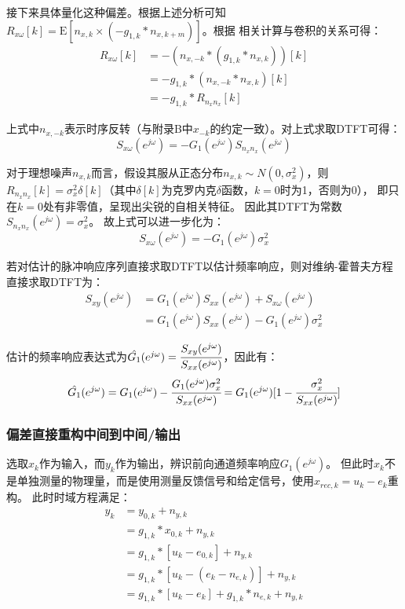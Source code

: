 接下来具体量化这种偏差。根据上述分析可知\(R_{x\omega}[k]=\text{E}[n_{x,k}\times(-g_{1,k}*n_{x,k+m})]\)。根据
相关计算与卷积的关系可得：
\begin{align*}
    R_{x\omega}[k]&=-(n_{x,-k}*(g_{1,k}*n_{x,k}))[k]\\
    &=-g_{1,k} * (n_{x,-k}*n_{x,k})[k]\\
    &=-g_{1,k}*R_{n_xn_x}[k]
\end{align*}

上式中\(n_{x,-k}\)表示时序反转（与附录B中\(x_{-k}\)的约定一致）。对上式求取DTFT可得：
\begin{equation*}
    S_{x\omega}(e^{j\omega})=-G_1(e^{j\omega})S_{n_xn_x}(e^{j\omega})
\end{equation*}

对于理想噪声\(n_{x,k}\)而言，假设其服从正态分布\(n_{x,k}\sim N(0,\sigma_x^2)\)，则
\(R_{n_xn_x}[k]=\sigma_x^2\delta[k]\)（其中\(\delta[k]\)为克罗内克\(\delta\)函数，\(k=0\)时为1，否则为0），
即只在\(k=0\)处有非零值，呈现出尖锐的自相关特征。
因此其DTFT为常数\(S_{n_xn_x}(e^{j\omega})=\sigma_x^2\)。
故上式可以进一步化为：
\begin{equation*}
    S_{x\omega}(e^{j\omega})=-G_1(e^{j\omega})\sigma_x^2
\end{equation*}

若对估计的脉冲响应序列直接求取DTFT以估计频率响应，则对维纳-霍普夫方程直接求取DTFT为：
\begin{align*}
    S_{xy}(e^{j\omega})&=G_1(e^{j\omega})S_{xx}(e^{j\omega})+S_{x\omega}(e^{j\omega})\\
    &=G_1(e^{j\omega})S_{xx}(e^{j\omega})-G_1(e^{j\omega})\sigma_x^2
\end{align*}

估计的频率响应表达式为\(\hat{G_1}(e^{j\omega})=\cfrac{S_{xy}(e^{j\omega})}{S_{xx}(e^{j\omega})}\)，因此有：
\begin{equation}
    \hat{G_1}(e^{j\omega})=G_1(e^{j\omega})-\cfrac{G_1(e^{j\omega})\sigma_x^2}{S_{xx}(e^{j\omega})}
    =G_1(e^{j\omega})[1-\cfrac{\sigma_x^2}{S_{xx}(e^{j\omega})}]
    \label{eq:闭环有偏性公式}
\end{equation}

\subsubsection{偏差直接重构中间到中间/输出}
选取\(x_k\)作为输入，而\(y_k\)作为输出，辨识前向通道频率响应\(G_1(e^{j\omega})\)。
但此时\(x_k\)不是单独测量的物理量，而是使用测量反馈信号和给定信号，使用\(x_{rec,k}=u_k-e_k\)重构。
此时时域方程满足：
\begin{align*}
    y_k&=y_{0,k}+n_{y,k}\\
    &=g_{1,k}*x_{0,k}+n_{y,k}\\
    &=g_{1,k}*[u_k-e_{0,k}]+n_{y,k}\\
    &=g_{1,k}*[u_k-(e_k-n_{e,k})]+n_{y,k}\\
    &=g_{1,k}*[u_k-e_k]+g_{1,k}*n_{e,k}+n_{y,k}
\end{align*}


